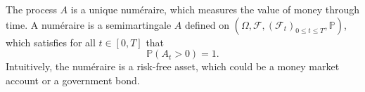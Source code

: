 
The process $A$ is a unique numéraire, which measures the value of money through time. A numéraire is a semimartingale $A$ defined on $(\Omega,\mathcal{F},(\mathcal{F}_{t})_{0\leq t\leq T},\mathbb{P})$, which satisfies for all $t\in [0,T]$ that 
\begin{equation}
    \mathbb{P}(A_{t}>0)=1.
\end{equation}
Intuitively, the numéraire is a risk-free asset, which could be a money market account or a government bond. 

